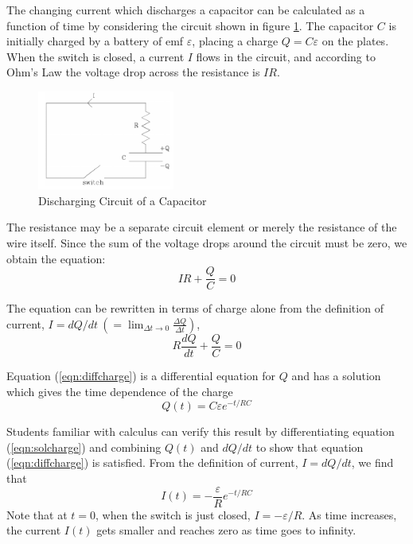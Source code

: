 The changing current which discharges a capacitor can be calculated as a function of time by considering the circuit shown in figure \ref{fig:capcircuit1}. The capacitor $C$ is initially charged by a battery of emf $\varepsilon$, placing a charge $Q = C\varepsilon$ on the plates. When the switch is closed, a current $I$ flows in the circuit, and according to Ohm's Law the voltage drop across the resistance is $IR$.

\begin{figure}[h]
    \begin{center}
        \includegraphics[width=0.4\textwidth]{./Exp4/pic/image2.png}
    \end{center}
    \caption{Discharging Circuit of a Capacitor}
    \label{fig:capcircuit1}
\end{figure}

The resistance may be a separate circuit element or merely the resistance of the wire itself. Since the sum of the voltage drops around the circuit must be zero, we obtain the equation:
\begin{equation}
    IR + \frac{Q}{C} = 0
\end{equation}

The equation can be rewritten in terms of charge alone from the definition of current, $\displaystyle I = dQ/dt \ \left(=\lim_{\Delta t\to 0} \frac{\Delta Q}{\Delta t}\right)$,
\begin{equation}
    R\frac{dQ}{dt} + \frac{Q}{C} = 0
    \label{eqn:diffcharge}
\end{equation}

Equation (\ref{eqn:diffcharge}) is a differential equation for $Q$ and has a solution which gives the time dependence of the charge
\begin{equation}
    Q(t) = C\varepsilon e^{-t/RC}
    \label{eqn:solcharge}
\end{equation}

Students familiar with calculus can verify this result by differentiating equation (\ref{eqn:solcharge}) and combining $Q(t)$ and $dQ/dt$ to show that equation (\ref{eqn:diffcharge}) is satisfied. From the definition of current, $I = dQ/dt$, we find that
\begin{equation}
    I(t) = -\frac{\varepsilon}{R}e^{-t/RC}
    \label{eqn:dischargecurrent}
\end{equation}
Note that at $t=0$, when the switch is just closed, $I = -\varepsilon/R$. As time increases, the current $I(t)$ gets smaller and reaches zero as time goes to infinity.

